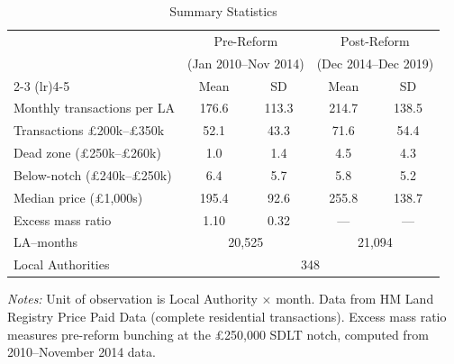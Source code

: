 \begin{table}[htbp]
\centering
\caption{Summary Statistics}
\label{tab:sumstats}
\small
\begin{tabular}{lcccc}
\hline\hline
 & \multicolumn{2}{c}{Pre-Reform} & \multicolumn{2}{c}{Post-Reform} \\
 & \multicolumn{2}{c}{(Jan 2010--Nov 2014)} & \multicolumn{2}{c}{(Dec 2014--Dec 2019)} \\
\cmidrule(lr){2-3} \cmidrule(lr){4-5}
 & Mean & SD & Mean & SD \\
\hline
Monthly transactions per LA & 176.6 & 113.3 & 214.7 & 138.5 \\
Transactions \pounds200k--\pounds350k & 52.1 & 43.3 & 71.6 & 54.4 \\
Dead zone (\pounds250k--\pounds260k) & 1.0 & 1.4 & 4.5 & 4.3 \\
Below-notch (\pounds240k--\pounds250k) & 6.4 & 5.7 & 5.8 & 5.2 \\
Median price (\pounds1,000s) & 195.4 & 92.6 & 255.8 & 138.7 \\
\addlinespace
Excess mass ratio & 1.10 & 0.32 & --- & --- \\
\hline
LA--months & \multicolumn{2}{c}{20,525} & \multicolumn{2}{c}{21,094} \\
Local Authorities & \multicolumn{4}{c}{348} \\
\hline\hline
\end{tabular}
\begin{minipage}{0.95\textwidth}\vspace{0.3em}
\footnotesize\textit{Notes:} Unit of observation is Local Authority $\times$ month. Data from HM Land Registry Price Paid Data (complete residential transactions). Excess mass ratio measures pre-reform bunching at the \pounds250,000 SDLT notch, computed from 2010--November 2014 data.
\end{minipage}
\end{table}

